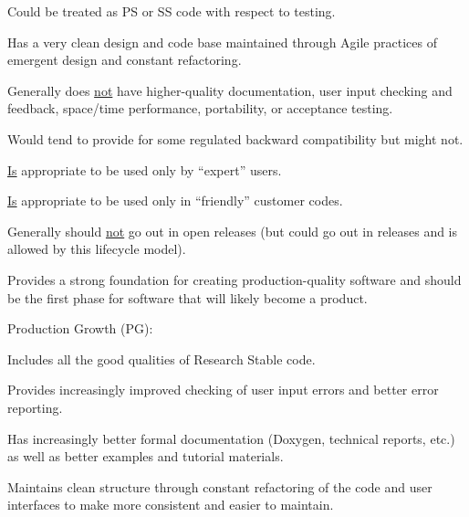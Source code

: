 \documentclass[11pt]{SANDreport}
\begin{document}
\begin{compactenum}
\begin{compactitem}
{}\item Could be treated as PS or SS code with respect to testing.

{}\item Has a very clean design and code base maintained through Agile practices of emergent design and constant refactoring.

{}\item Generally does {}\underline{not} have higher-quality documentation, user input checking and feedback, space/time performance, portability, or acceptance testing.

{}\item Would tend to provide for some regulated backward
compatibility but might not.

{}\item {}\underline{Is} appropriate to be used only by ``expert''
users.

{}\item {}\underline{Is} appropriate to be used only in ``friendly''
customer codes.

{}\item Generally should {}\underline{not} go out in open releases (but could go out in releases and is allowed by this lifecycle model).

{}\item Provides a strong foundation for creating production-quality software and should be the first phase for software that will likely
become a product.

\end{compactitem}

{}\item Production Growth (PG):

\begin{compactitem}

{}\item Includes all the good qualities of Research Stable code.

{}\item Provides increasingly improved checking of user input errors and better error reporting.

{}\item Has increasingly better formal documentation (Doxygen, technical reports, etc.) as well as better examples and tutorial materials.

{}\item Maintains clean structure through constant refactoring of the code and user interfaces to make more consistent and easier to maintain.


\end{compactitem}
\end{compactenum}
\end{document}
